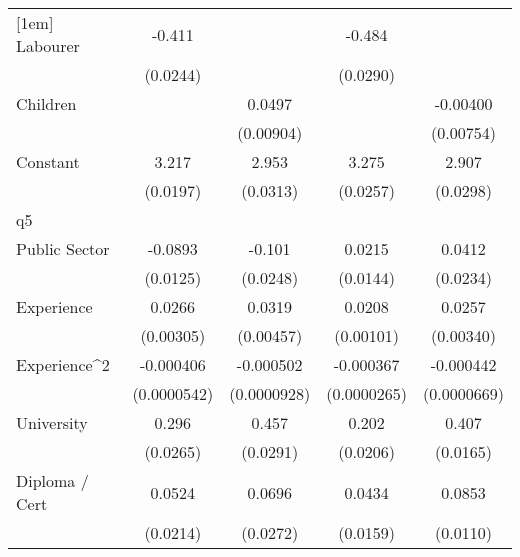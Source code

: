 {\begin{tabular}{l*{4}{c}}
[1em]
Labourer            &      -0.411\sym{***}&                     &      -0.484\sym{***}&                     \\
                    &    (0.0244)         &                     &    (0.0290)         &                     \\
[1em]
Children            &                     &      0.0497\sym{***}&                     &    -0.00400         \\
                    &                     &   (0.00904)         &                     &   (0.00754)         \\
[1em]
Constant            &       3.217\sym{***}&       2.953\sym{***}&       3.275\sym{***}&       2.907\sym{***}\\
                    &    (0.0197)         &    (0.0313)         &    (0.0257)         &    (0.0298)         \\
\hline
q5                  &                     &                     &                     &                     \\
Public Sector       &     -0.0893\sym{***}&      -0.101\sym{***}&      0.0215         &      0.0412         \\
                    &    (0.0125)         &    (0.0248)         &    (0.0144)         &    (0.0234)         \\
[1em]
Experience          &      0.0266\sym{***}&      0.0319\sym{***}&      0.0208\sym{***}&      0.0257\sym{***}\\
                    &   (0.00305)         &   (0.00457)         &   (0.00101)         &   (0.00340)         \\
[1em]
Experience^{2}      &   -0.000406\sym{***}&   -0.000502\sym{***}&   -0.000367\sym{***}&   -0.000442\sym{***}\\
                    & (0.0000542)         & (0.0000928)         & (0.0000265)         & (0.0000669)         \\
[1em]
University          &       0.296\sym{***}&       0.457\sym{***}&       0.202\sym{***}&       0.407\sym{***}\\
                    &    (0.0265)         &    (0.0291)         &    (0.0206)         &    (0.0165)         \\
[1em]
Diploma / Cert      &      0.0524\sym{*}  &      0.0696\sym{*}  &      0.0434\sym{**} &      0.0853\sym{***}\\
                    &    (0.0214)         &    (0.0272)         &    (0.0159)         &    (0.0110)         \\

\end{tabular}}
